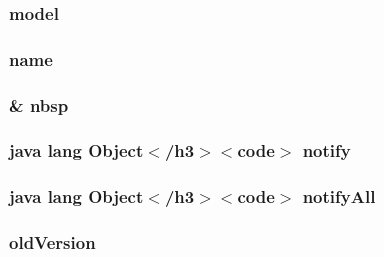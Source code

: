 \hypertarget{_cloudia_d_b_8html_a508cc3106d2c29fe07dc87cbe3ea6927}{
\subsubsection[{model}]{\setlength{\rightskip}{0pt plus 5cm}model}}\label{_cloudia_d_b_8html_a508cc3106d2c29fe07dc87cbe3ea6927}
\hypertarget{_cloudia_d_b_8html_ab74e6bf80237ddc4109968cedc58c151}{
\subsubsection[{name}]{\setlength{\rightskip}{0pt plus 5cm}name}}\label{_cloudia_d_b_8html_ab74e6bf80237ddc4109968cedc58c151}
\hypertarget{_cloudia_d_b_8html_aef915316f784c9063d942974538301a6}{
\subsubsection[{nbsp}]{\setlength{\rightskip}{0pt plus 5cm}\& nbsp}}\label{_cloudia_d_b_8html_aef915316f784c9063d942974538301a6}
\hypertarget{_cloudia_d_b_8html_ae99ae10b5010594dbda4794e02db271b}{
\subsubsection[{notify}]{\setlength{\rightskip}{0pt plus 5cm}java lang Object$<$/h3$>$$<$code$>$ notify}}\label{_cloudia_d_b_8html_ae99ae10b5010594dbda4794e02db271b}
\hypertarget{_cloudia_d_b_8html_a1279357e6e09e33e75b55eb05fdb6436}{
\subsubsection[{notify\-All}]{\setlength{\rightskip}{0pt plus 5cm}java lang Object$<$/h3$>$$<$code$>$ notify\-All}}\label{_cloudia_d_b_8html_a1279357e6e09e33e75b55eb05fdb6436}
\hypertarget{_cloudia_d_b_8html_ae74b2c5e87ac6793ce49c8edfa694a35}{
\subsubsection[{old\-Version}]{\setlength{\rightskip}{0pt plus 5cm}old\-Version}}\label{_cloudia_d_b_8html_ae74b2c5e87ac6793ce49c8edfa694a35}
